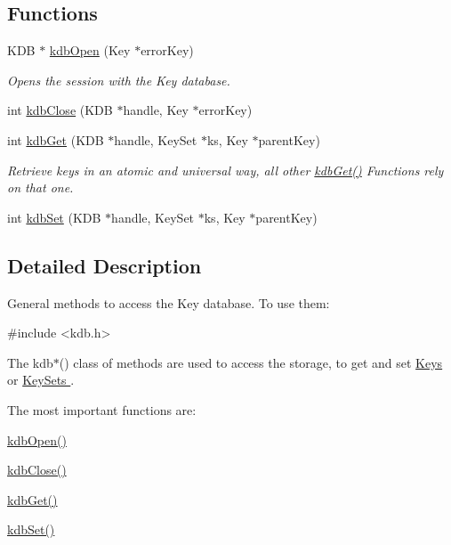 \subsection*{Functions}
\begin{DoxyCompactItemize}
\item 
K\-D\-B $\ast$ \hyperlink{group__kdb_ga6808defe5870f328dd17910aacbdc6ca}{kdb\-Open} (Key $\ast$error\-Key)
\begin{DoxyCompactList}\small\item\em Opens the session with the Key database. \end{DoxyCompactList}\item 
int \hyperlink{group__kdb_gadb54dc9fda17ee07deb9444df745c96f}{kdb\-Close} (K\-D\-B $\ast$handle, Key $\ast$error\-Key)
\item 
int \hyperlink{group__kdb_ga28e385fd9cb7ccfe0b2f1ed2f62453a1}{kdb\-Get} (K\-D\-B $\ast$handle, Key\-Set $\ast$ks, Key $\ast$parent\-Key)
\begin{DoxyCompactList}\small\item\em Retrieve keys in an atomic and universal way, all other \hyperlink{group__kdb_ga28e385fd9cb7ccfe0b2f1ed2f62453a1}{kdb\-Get()} Functions rely on that one. \end{DoxyCompactList}\item 
int \hyperlink{group__kdb_ga11436b058408f83d303ca5e996832bcf}{kdb\-Set} (K\-D\-B $\ast$handle, Key\-Set $\ast$ks, Key $\ast$parent\-Key)
\end{DoxyCompactItemize}


\subsection{Detailed Description}
General methods to access the Key database. To use them\-: 
\begin{DoxyCode}
\textcolor{preprocessor}{#include <kdb.h>}
\end{DoxyCode}


The kdb$\ast$() class of methods are used to access the storage, to get and set \hyperlink{group__key}{Keys } or \hyperlink{group__keyset}{Key\-Sets }.

The most important functions are\-:
\begin{DoxyItemize}
\item \hyperlink{group__kdb_ga6808defe5870f328dd17910aacbdc6ca}{kdb\-Open()}
\item \hyperlink{group__kdb_gadb54dc9fda17ee07deb9444df745c96f}{kdb\-Close()}
\item \hyperlink{group__kdb_ga28e385fd9cb7ccfe0b2f1ed2f62453a1}{kdb\-Get()}
\item \hyperlink{group__kdb_ga11436b058408f83d303ca5e996832bcf}{kdb\-Set()}
\end{DoxyItemize}

